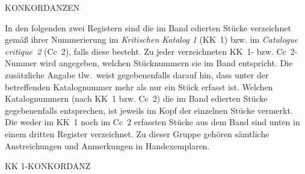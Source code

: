 \thispagestyle{empty}
\vspace{3.0ex}
\begin{center}\uppercase{\normalsize Konkordanzen}\end{center}
\footnotesize
%
\vspace{3.0ex}
In den folgenden zwei Registern sind die im Band edierten St\"{u}cke verzeichnet
gemäß ihrer Nummerierung im \textit{Kritischen Katalog 1} (KK~1) bzw. im \textit{Catalogue critique~2} (Cc~2),
falls diese besteht.
Zu jeder ver\-zeich\-ne\-ten KK~1- bzw. Cc~2-Nummer wird angegeben,
welchen Stücknummern sie im Band entspricht.
Die zusätzliche Angabe \glqq tlw.\grqq\ weist gegebenenfalls darauf hin,
dass unter der betreffenden Katalognummer mehr als nur ein St\"{u}ck erfasst ist.
Welchen Kata\-log\-nummern (nach KK~1 bzw. Cc~2) die im Band edierten Stücke gegebenenfalls entsprechen,
ist jeweils im Kopf der einzelnen Stücke vermerkt.
\newline\indent%
Die weder im KK~1 noch im Cc~2 erfassten Stücke aus dem Band
sind unten in einem dritten Register verzeichnet.
Zu dieser Gruppe gehören sämtliche Anstreichungen und Anmerkungen in Hand\-exemplaren.
%
\\[4.0ex]
%
%
\begin{center}\footnotesize{\uppercase{KK 1-Konkordanz}}\end{center}


